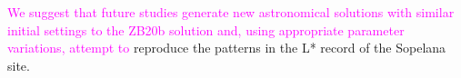 \documentclass[draft]{agujournal2019}
\newcommand{\rez}{\textcolor{magenta}}
\begin{document}
\rez{We suggest that future studies generate new astronomical solutions with similar initial settings to the ZB20b solution and, using appropriate parameter variations, attempt to} reproduce the patterns in the \gls{L*} record of the Sopelana site.





%
%
%
%
%
%
%
%
%
%
\end{document}
